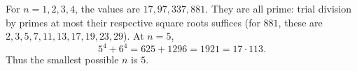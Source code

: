 For $n=1,2,3,4$, the values are $17,97,337,881$. They are all prime: trial division by primes at most their respective square roots suffices (for $881$, these are $2,3,5,7,11,13,17,19,23,29$). At $n=5$,
\[
5^4+6^4=625+1296=1921=17\cdot113.
\]
Thus the smallest possible $n$ is $\boxed5$.
